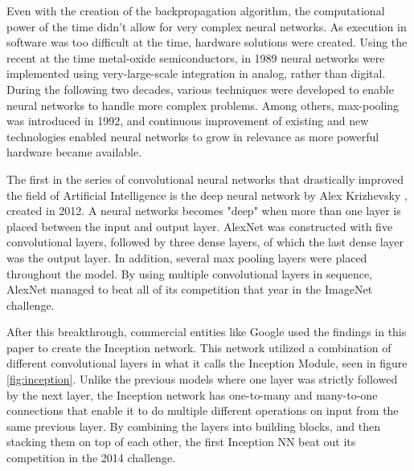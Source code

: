 Even with the creation of the backpropagation algorithm, the computational power of the time didn't allow for very complex neural networks. 
As execution in software was too difficult at the time, hardware solutions were created. Using the recent at the time metal-oxide semiconductors, in 1989 neural networks were implemented using very-large-scale integration in analog, rather than digital\cite{mead2012analog}. 
During the following two decades, various techniques were developed to enable neural networks to handle more complex problems.
Among others, max-pooling was introduced in 1992\cite{cresceptron1992}, and continuous improvement of existing and new technologies enabled neural networks to grow in relevance as more powerful hardware became available.


The first in the series of convolutional neural networks that drastically improved the field of Artificial Intelligence is the deep neural network by Alex Krizhevsky \cite{Krizhevsky:2017:ICD:3098997.3065386}, created in 2012. 
A neural networks becomes "deep" when more than one layer is placed between the input and output layer.
AlexNet was constructed with five convolutional layers, followed by three dense layers, of which the last dense layer was the output layer.
In addition, several max pooling layers were placed throughout the model.
By using multiple convolutional layers in sequence, AlexNet managed to beat all of its competition that year in the ImageNet\cite{ImageNetMain} challenge\cite{ImageNet2012}. 



After this breakthrough, commercial entities like Google used the findings in this paper to create the Inception\cite{szegedy2014going} network. 
This network utilized a combination of different convolutional layers in what it calls the Inception Module, seen in figure \cref{fig:inception}.
Unlike the previous models where one layer was strictly followed by the next layer, the Inception network has one-to-many and many-to-one connections that enable it to do multiple different operations on input from the same previous layer.
By combining the layers into building blocks, and then stacking them on top of each other, the first Inception NN beat out its competition in the 2014 challenge\cite{ImageNet2014}. %
%


